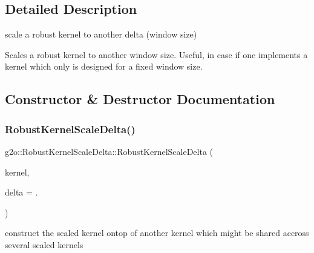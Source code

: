 \subsection{Detailed Description}
scale a robust kernel to another delta (window size) 

Scales a robust kernel to another window size. Useful, in case if one implements a kernel which only is designed for a fixed window size. 

\subsection{Constructor \& Destructor Documentation}
\mbox{\label{classg2o_1_1_robust_kernel_scale_delta_acffeae7f685e69018f5b0222155a6eb2}} 
\subsubsection{\texorpdfstring{Robust\+Kernel\+Scale\+Delta()}{RobustKernelScaleDelta()}\hspace{0.1cm}{\footnotesize\ttfamily [1/2]}}
{\footnotesize\ttfamily g2o\+::\+Robust\+Kernel\+Scale\+Delta\+::\+Robust\+Kernel\+Scale\+Delta (\begin{DoxyParamCaption}\item[{const \mbox{\hyperlink{namespaceg2o_a0802a5e01a6b1861ae01013220dec6ac}{Robust\+Kernel\+Ptr}} \&}]{kernel,  }\item[{double}]{delta = {.} }\end{DoxyParamCaption})\hspace{0.3cm}{\ttfamily [explicit]}}

construct the scaled kernel ontop of another kernel which might be shared accross several scaled kernels \mbox{\label{classg2o_1_1_robust_kernel_scale_delta_a537a88b2ff5432fb9e1ad2aaa85f60b9}} 
